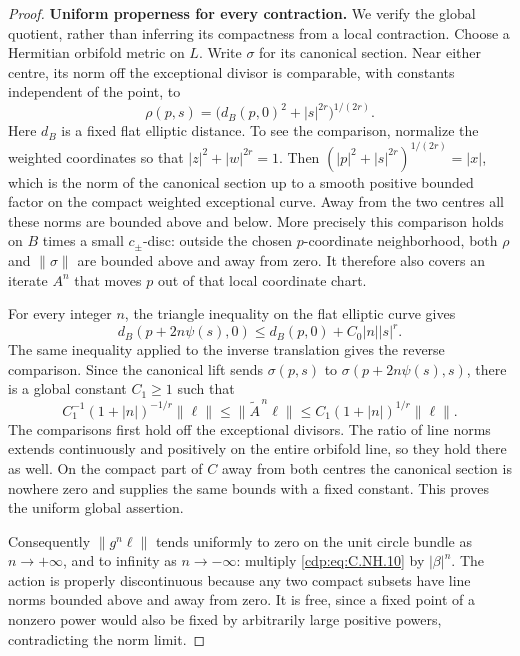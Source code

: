 \begin{proof}
\par\medskip\noindent\textbf{Uniform properness for every contraction.}
We verify the global quotient, rather than inferring its
compactness from a local contraction. Choose a Hermitian
orbifold metric on $L$. Write $\sigma$ for its canonical
section. Near either centre, its norm off the exceptional
divisor is comparable, with constants independent of the
point, to
\[
       \rho(p,s)=\bigl(d_B(p,0)^2+|s|^{2r}\bigr)^{1/(2r)}.
                                                        \tag{C.NH.9}\label{cdp:eq:C.NH.9}
\]
Here $d_B$ is a fixed flat elliptic distance. To see the
comparison, normalize the weighted coordinates so that
$|z|^2+|w|^{2r}=1$. Then
$(|p|^2+|s|^{2r})^{1/(2r)}=|x|$, which is the norm of the
canonical section up to a smooth positive bounded factor
on the compact weighted exceptional curve. Away from the
two centres all these norms are bounded above and below.
More precisely this comparison holds on $B$ times a small
$c_\pm$-disc: outside the chosen $p$-coordinate neighborhood,
both $\rho$ and $\|\sigma\|$ are bounded above and away from
zero. It therefore also covers an iterate $A^n$ that moves
$p$ out of that local coordinate chart.

For every integer $n$, the triangle inequality on the flat
elliptic curve gives
\[
 d_B(p+2n\psi(s),0)
       \le d_B(p,0)+C_0|n||s|^r.
\]
The same inequality applied to the inverse translation
gives the reverse comparison. Since the canonical lift
sends $\sigma(p,s)$ to $\sigma(p+2n\psi(s),s)$, there is
a global constant $C_1\ge1$ such that
\[
 C_1^{-1}(1+|n|)^{-1/r}\|\ell\|
 \le \|\widetilde A^{\,n}\ell\|
 \le C_1(1+|n|)^{1/r}\|\ell\|.
                                                        \tag{C.NH.10}\label{cdp:eq:C.NH.10}
\]
The comparisons first hold off the exceptional divisors.
The ratio of line norms extends continuously and positively
on the entire orbifold line, so they hold there as well.
On the compact part of $C$ away from both centres the
canonical section is nowhere zero and supplies the same
bounds with a fixed constant. This proves the uniform
global assertion.

Consequently $\|g^n\ell\|$ tends uniformly to zero on the
unit circle bundle as $n\to+\infty$, and to infinity as
$n\to-\infty$: multiply \eqref{cdp:eq:C.NH.10} by $|\beta|^n$.
The action is properly discontinuous because any two
compact subsets have line norms bounded above and away
from zero. It is free, since a fixed point of a nonzero
power would also be fixed by arbitrarily large positive
powers, contradicting the norm limit.


\end{proof}
